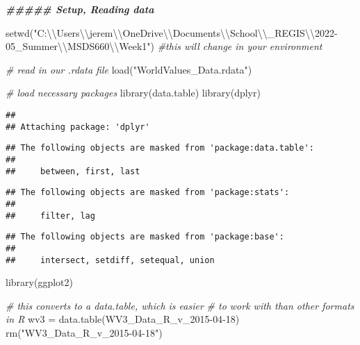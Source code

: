 \documentclass[
]{article}
\newenvironment{Shaded}{\begin{snugshade}}{\end{snugshade}}
\newcommand{\AttributeTok}[1]{\textcolor[rgb]{0.77,0.63,0.00}{#1}}
\newcommand{\CommentTok}[1]{\textcolor[rgb]{0.56,0.35,0.01}{\textit{#1}}}
\newcommand{\DocumentationTok}[1]{\textcolor[rgb]{0.56,0.35,0.01}{\textbf{\textit{#1}}}}
\newcommand{\FunctionTok}[1]{\textcolor[rgb]{0.00,0.00,0.00}{#1}}
\newcommand{\NormalTok}[1]{#1}
\newcommand{\OtherTok}[1]{\textcolor[rgb]{0.56,0.35,0.01}{#1}}
\newcommand{\SpecialCharTok}[1]{\textcolor[rgb]{0.00,0.00,0.00}{#1}}
\newcommand{\StringTok}[1]{\textcolor[rgb]{0.31,0.60,0.02}{#1}}
\begin{document}
\begin{Shaded}
\begin{Highlighting}[]
\DocumentationTok{\#\#\#\#\# Setup, Reading data}

\FunctionTok{setwd}\NormalTok{(}\StringTok{"C:}\SpecialCharTok{\textbackslash{}\textbackslash{}}\StringTok{Users}\SpecialCharTok{\textbackslash{}\textbackslash{}}\StringTok{jerem}\SpecialCharTok{\textbackslash{}\textbackslash{}}\StringTok{OneDrive}\SpecialCharTok{\textbackslash{}\textbackslash{}}\StringTok{Documents}\SpecialCharTok{\textbackslash{}\textbackslash{}}\StringTok{School}\SpecialCharTok{\textbackslash{}\textbackslash{}}\StringTok{\_REGIS}\SpecialCharTok{\textbackslash{}\textbackslash{}}\StringTok{2022{-}05\_Summer}\SpecialCharTok{\textbackslash{}\textbackslash{}}\StringTok{MSDS660}\SpecialCharTok{\textbackslash{}\textbackslash{}}\StringTok{Week1"}\NormalTok{) }\CommentTok{\#this will change in your environment}

\CommentTok{\# read in our .rdata file}
\FunctionTok{load}\NormalTok{(}\StringTok{"WorldValues\_Data.rdata"}\NormalTok{)}

\CommentTok{\# load necessary packages}
\FunctionTok{library}\NormalTok{(data.table)}
\FunctionTok{library}\NormalTok{(dplyr)}
\end{Highlighting}
\end{Shaded}

\begin{verbatim}
## 
## Attaching package: 'dplyr'
\end{verbatim}

\begin{verbatim}
## The following objects are masked from 'package:data.table':
## 
##     between, first, last
\end{verbatim}

\begin{verbatim}
## The following objects are masked from 'package:stats':
## 
##     filter, lag
\end{verbatim}

\begin{verbatim}
## The following objects are masked from 'package:base':
## 
##     intersect, setdiff, setequal, union
\end{verbatim}

\begin{Shaded}
\begin{Highlighting}[]
\FunctionTok{library}\NormalTok{(ggplot2)}

\CommentTok{\# this converts to a data.table, which is easier}
\CommentTok{\# to work with than other formats in R}
\NormalTok{wv3 }\OtherTok{=} \FunctionTok{data.table}\NormalTok{(}\StringTok{\textasciigrave{}}\AttributeTok{WV3\_Data\_R\_v\_2015{-}04{-}18}\StringTok{\textasciigrave{}}\NormalTok{)}
\FunctionTok{rm}\NormalTok{(}\StringTok{"WV3\_Data\_R\_v\_2015{-}04{-}18"}\NormalTok{)}
\end{Highlighting}
\end{Shaded}
\end{document}
